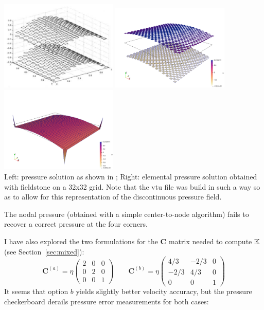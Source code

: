 \begin{center}
\includegraphics[width=5.6cm]{python_codes/fieldstone_14/results/dh/doneahuerta}
\includegraphics[width=5.6cm]{python_codes/fieldstone_14/results/dh/p_3D}
\includegraphics[width=5.6cm]{python_codes/fieldstone_14/results/dh/q_3D}\\
{\captionfont Left: pressure solution as shown in \cite{dohu03}; Right: elemental 
pressure solution obtained with fieldstone on a 32x32 grid. 
Note that the vtu file was build in such a way so as to allow for 
this representation of the discontinuous pressure field.}
\end{center}

The nodal pressure (obtained with a simple center-to-node algorithm)
fails to recover a correct pressure at the four corners.

I have also explored the two formulations for the ${\bm C}$ matrix needed to 
compute ${\mathbb{K}}$ (see Section~\ref{sec:mixed}):
\[
{\bm C}^{(a)}= \eta 
\left(
\begin{array}{ccc}
2 & 0 & 0 \\
0 & 2 & 0 \\
0 & 0 & 1
\end{array}
\right)
\qquad
{\bm C}^{(b)}= \eta
\left(
\begin{array}{ccc}
4/3 & -2/3 & 0 \\
-2/3 & 4/3 & 0 \\
0 & 0 & 1
\end{array}
\right)
\]
It seems that option $b$ yields slightly better velocity accuracy, but the pressure 
checkerboard derails pressure error measurements for both cases:

